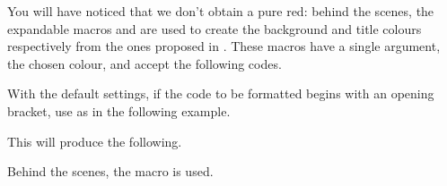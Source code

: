 \documentclass[10pt, a4paper]{article}
\begin{document}
\begin{tdocnote}
    You will have noticed that we don't obtain a pure red: behind the scenes, the expandable macros  and  are used to create the background and title colours respectively from the ones proposed in .
    These macros have a single argument, the chosen colour, and accept the following codes.

    \begin{tdoclatex}[code]
    \end{tdoclatex}
\end{tdocnote}




\begin{tdocwarn}
    With the default settings, if the code to be formatted begins with an opening bracket, use  as in the following example.


    This will produce the following.

    \medskip

    
\end{tdocwarn}


\begin{tdocnote}
    Behind the scenes, the  macro is used.

    \begin{tdoclatex}[std]
    \end{tdoclatex}
\end{tdocnote}
\end{document}
